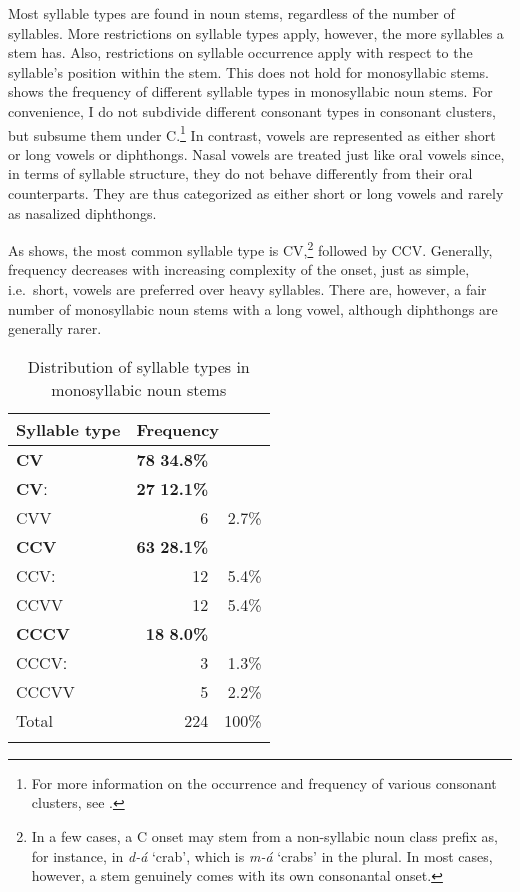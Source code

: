 Most syllable types are found in noun stems, regardless of the number of syllables.  More restrictions on syllable types apply, however, the more syllables a stem has. Also, restrictions on syllable occurrence apply with respect to the syllable's position within the stem. This does not hold for monosyllabic stems.  shows the frequency of different syllable types in monosyllabic noun stems. For convenience, I do not subdivide different consonant types in consonant clusters, but subsume them under C.\footnote{For more information on the occurrence and frequency of various consonant clusters, see .} In contrast, vowels are represented as either short or long vowels or diphthongs. Nasal vowels are treated just like oral vowels since, in terms of syllable structure, they do not behave differently from their oral counterparts. They are thus categorized as either short or long vowels and rarely as nasalized diphthongs.

As  shows, the most common syllable type is CV,\footnote{In a few cases, a C onset may stem from a non-syllabic noun class prefix as, for instance, in {\itshape d-á} `crab', which is {\itshape m-á} `crabs' in the plural. In most cases, however, a stem genuinely comes with its own consonantal onset.} followed by CCV. Generally, frequency decreases with increasing complexity of the onset, just as simple, i.e.\ short, vowels are preferred over heavy syllables.
 There are, however, a fair number of monosyllabic noun stems with a long vowel, although diphthongs are generally rarer.  



\begin{table}[t]
\begin{tabularx}{.8\textwidth}{Xrr}
\lsptoprule
Syllable type & \multicolumn{2}{l}{Frequency} \\
\midrule
{\bfseries CV}	&	{\bfseries 78} {\bfseries 34.8\%} \\
{\bfseries CVː} 	& 	{\bfseries 27}  {\bfseries 12.1\%} \\
CVV 	& 	6  & 2.7\% \\ \midrule

{\bfseries CCV} 	& 	{\bfseries 63} {\bfseries 28.1\%}  \\
CCVː & 	12 & 5.4\%  \\
CCVV & 	12 & 5.4\% \\ \midrule
		
{\bfseries CCCV} & 	{\bfseries 18} {\bfseries 8.0\%} \\
CCCVː & 	3 & 1.3\% \\
CCCVV & 	5 & 2.2\% \\  \midrule

Total & 224 & 100\% \\
\lspbottomrule
\end{tabularx}
\caption{Distribution of syllable types in monosyllabic noun stems}
\label{Tab:o1Syll}
\end{table} 
		
